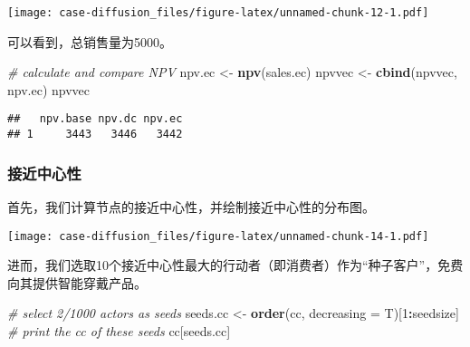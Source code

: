 \documentclass[]{article}
\newenvironment{Shaded}{\begin{snugshade}}{\end{snugshade}}
\newcommand{\CommentTok}[1]{\textcolor[rgb]{0.56,0.35,0.01}{\textit{#1}}}
\newcommand{\DataTypeTok}[1]{\textcolor[rgb]{0.13,0.29,0.53}{#1}}
\newcommand{\DecValTok}[1]{\textcolor[rgb]{0.00,0.00,0.81}{#1}}
\newcommand{\FloatTok}[1]{\textcolor[rgb]{0.00,0.00,0.81}{#1}}
\newcommand{\KeywordTok}[1]{\textcolor[rgb]{0.13,0.29,0.53}{\textbf{#1}}}
\newcommand{\NormalTok}[1]{#1}
\newcommand{\OperatorTok}[1]{\textcolor[rgb]{0.81,0.36,0.00}{\textbf{#1}}}
\newcommand{\StringTok}[1]{\textcolor[rgb]{0.31,0.60,0.02}{#1}}
\begin{document}
\texttt{[image: case-diffusion\_files/figure-latex/unnamed-chunk-12-1.pdf]}

可以看到，总销售量为5000。

\begin{Shaded}
\begin{Highlighting}[]
\CommentTok{# calculate and compare NPV}
\NormalTok{npv.ec <-}\StringTok{ }\KeywordTok{npv}\NormalTok{(sales.ec)}
\NormalTok{npvvec <-}\StringTok{ }\KeywordTok{cbind}\NormalTok{(npvvec, npv.ec)}
\NormalTok{npvvec}
\end{Highlighting}
\end{Shaded}

\begin{verbatim}
##   npv.base npv.dc npv.ec
## 1     3443   3446   3442
\end{verbatim}

\subsubsection{接近中心性}

首先，我们计算节点的接近中心性，并绘制接近中心性的分布图。

\begin{Shaded}
\end{Shaded}

\texttt{[image: case-diffusion\_files/figure-latex/unnamed-chunk-14-1.pdf]}

进而，我们选取10个接近中心性最大的行动者（即消费者）作为``种子客户''，免费向其提供智能穿戴产品。

\begin{Shaded}
\begin{Highlighting}[]
\CommentTok{# select 2/1000 actors as seeds}
\NormalTok{seeds.cc <-}\StringTok{ }\KeywordTok{order}\NormalTok{(cc, }\DataTypeTok{decreasing =}\NormalTok{ T)[}\DecValTok{1}\OperatorTok{:}\NormalTok{seedsize]}
\CommentTok{# print the cc of these seeds}
\NormalTok{cc[seeds.cc]}
\end{Highlighting}
\end{Shaded}
\end{document}
